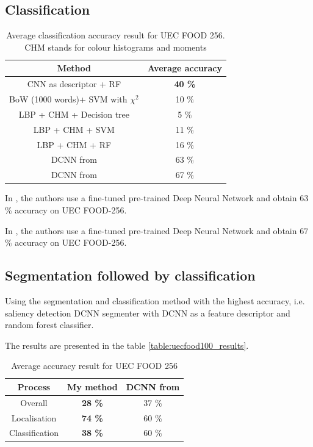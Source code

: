 \subsection{Classification}

\begin{table}
    \centering
    \renewcommand{\arraystretch}{1.2}
    \begin{tabulary}{\textwidth}{| c | C|}
        \hline
        Method & Average accuracy \\
        \hline
        CNN as descriptor + RF & \textbf{40 \%} \\ 
        \hline
        BoW (1000 words)+ SVM with $\chi^2$ & 10 \% \\ %
        \hline
        LBP + CHM + Decision tree & 5 \% \\ 
        \hline
        LBP + CHM + SVM & 11 \% \\ %
        \hline
        LBP + CHM + RF & 16 \% \\ %
        \hline
        DCNN from \cite{Bolanos2016} & 63 \%\\
        \hline 
        DCNN from \cite{Yanai2015} & 67 \%\\
        \hline 
    \end{tabulary}
    \caption[Average classification accuracy result for UEC FOOD 256]{Average classification accuracy result for UEC FOOD 256. CHM stands for colour histograms and moments}
\end{table}

In \cite{Bolanos2016}, the authors use a fine-tuned pre-trained Deep Neural Network and obtain 63 \% accuracy on UEC FOOD-256.

In \cite{Yanai2015}, the authors use a fine-tuned pre-trained Deep Neural Network and obtain 67 \% accuracy on UEC FOOD-256.


\subsection{Segmentation followed by classification}

Using the segmentation and classification method with the highest accuracy, i.e. saliency detection DCNN segmenter with DCNN as a feature descriptor and random forest classifier.

The results are presented in the table \ref{table:uecfood100_results}.

\begin{table}
    \centering
    \renewcommand{\arraystretch}{1.2}
    \begin{tabulary}{\textwidth}{| c | C C|}
        \hline
        Process & My method & DCNN from \cite{Bolanos2016} \\
        \hline
        Overall & \textbf{28 \%} & 37 \% \\ 
        \hline
        Localisation &  \textbf{74 \%} & 60 \% \\
        \hline
        Classification &  \textbf{38 \%} & 60 \% \\
        \hline
    \end{tabulary}
    \caption{Average accuracy result for UEC FOOD 256}
    \label{table:uecfodd256_results}
\end{table}


